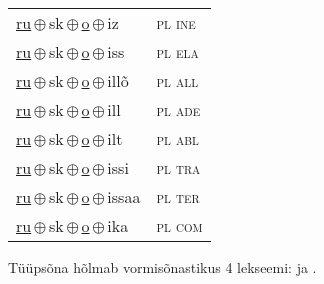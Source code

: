 \begin{minipage}{\textwidth}
\begin{sideways}
\begin{tabular}{l l}
\underline{ru}\,$\oplus$\,sk\,$\oplus$\,\underline{o}\,$\oplus$\,iz & \textsc{ pl ine } \\
\underline{ru}\,$\oplus$\,sk\,$\oplus$\,\underline{o}\,$\oplus$\,iss & \textsc{ pl ela } \\
\underline{ru}\,$\oplus$\,sk\,$\oplus$\,\underline{o}\,$\oplus$\,illõ & \textsc{ pl all } \\
\underline{ru}\,$\oplus$\,sk\,$\oplus$\,\underline{o}\,$\oplus$\,ill & \textsc{ pl ade } \\
\underline{ru}\,$\oplus$\,sk\,$\oplus$\,\underline{o}\,$\oplus$\,ilt & \textsc{ pl abl } \\
\underline{ru}\,$\oplus$\,sk\,$\oplus$\,\underline{o}\,$\oplus$\,issi & \textsc{ pl tra } \\
\underline{ru}\,$\oplus$\,sk\,$\oplus$\,\underline{o}\,$\oplus$\,issaa & \textsc{ pl ter } \\
\underline{ru}\,$\oplus$\,sk\,$\oplus$\,\underline{o}\,$\oplus$\,ika & \textsc{ pl com } \\
\end{tabular}
\end{sideways}
\label{tab:tüüpsõnamall-rusko}

\end{minipage}

 
\vspace{1em}
\noindent Tüüpsõna hõlmab vormisõnastikus 4 lekseemi:  ja .
